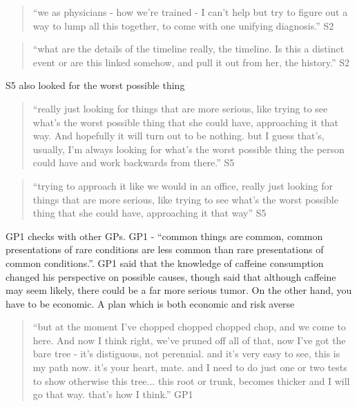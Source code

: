 \documentclass{sigchi}
\begin{document}
\begin{quote}
    ``we as physicians - how we're trained - I can't help but try to figure out a way to lump all this together, to come with one unifying diagnosis.'' S2
\end{quote}

\begin{quote}
    ``what are the details of the timeline really, the timeline. Is this a distinct event or are this linked somehow, and pull it out from her, the history.''  S2
\end{quote}

S5 also looked for the worst possible thing

\begin{quote}
    ``really just looking for things that are more serious, like trying to see what's the worst possible thing that she could have, approaching it that way. And hopefully it will turn out to be nothing. but I guess that's, usually, I'm always looking for what's the worst possible thing the person could have and work backwards from there.'' S5
\end{quote}

\begin{quote}
    ``trying to approach it like we would in an office, really just looking for things that are more serious, like trying to see what's the worst possible thing that she could have, approaching it that way'' S5
\end{quote}

GP1 checks with other GPs. GP1 - ``common things are common, common presentations of rare conditions are less common than rare presentations of common conditions.''. GP1 said that the knowledge of caffeine consumption changed his perspective on possible causes, though said that although caffeine may seem likely, there could be a far more serious tumor. On the other hand, you have to be economic. A plan which is both economic and risk averse

\begin{quote}
    ``but at the moment I've chopped chopped chopped chop, and we come to here. And now I think right, we've pruned off all of that, now I've got the bare tree - it's distiguous, not perennial. and it's very easy to see, this is my path now. it's your heart, mate. and I need to do just one or two tests to show otherwise this tree... this root or trunk, becomes thicker and I will go that way. that's how I think.'' GP1
\end{quote}
\end{document}
